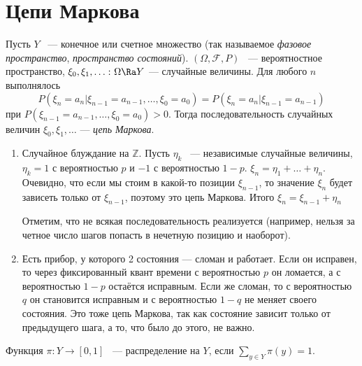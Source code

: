 \section{Цепи Маркова}

 \begin{definition}
     Пусть $Y$ ~--- конечное или счетное множество (так называемое \textit{фазовое пространство}, \textit{пространство состояний}).
     $(\Omega, \mathcal{F}, P)$ ~--- вероятностное пространство, $\xi_0, \xi_1, \ldots \colon \Omega \Ra Y$ --- случайные величины.
Для любого $n$ выполнялось 
$$P(\xi_n = a_n | \xi_{n-1} = a_{n - 1}, \ldots, \xi_0 = a_0 ) = P(\xi_n = a_n | \xi_{n- 1} = a_{n - 1})$$
 при $P(\xi_{n - 1} = a_{n-1}, \ldots, \xi_0 = a_0) > 0$.
 Тогда последовательность случайных величин $\xi_0, \xi_1,  \ldots$ --- \textit{цепь Маркова}.
 \end{definition}
 \begin{examples}
\enewline
     \begin{enumerate}
         \item Случайное блуждание на $\mathbb{Z}$.
               Пусть $\eta_k$ ~--- независимые случайные величины, $\eta_k = 1$ с вероятностью $p$ и $-1$ с вероятностью $1-p$. $\xi_n = \eta_1 + \ldots + \eta_n$.
               Очевидно, что если мы стоим в какой-то позиции $\xi_{n - 1}$, то значение $\xi_n$ будет зависеть только от $\xi_{n - 1}$,
               поэтому это цепь Маркова. Итого $\xi_n = \xi_{n - 1} + \eta_n$

               Отметим, что не всякая последовательность реализуется (например, нельзя за четное число шагов попасть в нечетную позицию и наоборот).

         \item Есть прибор, у которого 2 состояния --- сломан и работает. Если он исправен, то через фиксированный квант времени с вероятностью $p$ он ломается, а с вероятностью $1-p$ остаётся исправным. Если же сломан, то с вероятностью $q$ он становится исправным и с вероятностью $1-q$ не меняет своего состояния.
               Это тоже цепь Маркова, так как состояние зависит только от предыдущего шага, а то, что было до этого, не важно.
     \end{enumerate}
 \end{examples}
 
  \begin{definition}
     Функция $\pi\colon Y \to [0, 1]$ ~--- распределение на $Y$, если  $\sum_{y\in Y} \pi(y) = 1$.
 \end{definition}


